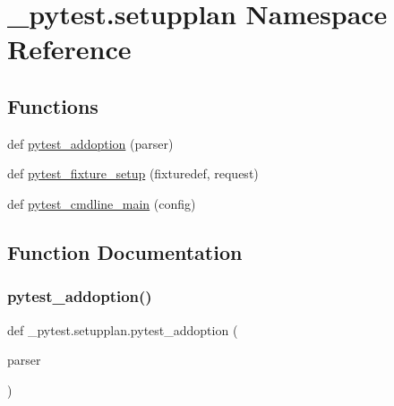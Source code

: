 \hypertarget{namespace__pytest_1_1setupplan}{}\section{\+\_\+pytest.\+setupplan Namespace Reference}
\label{namespace__pytest_1_1setupplan}
\subsection*{Functions}
\begin{DoxyCompactItemize}
\item 
def \hyperlink{namespace__pytest_1_1setupplan_ac461db32bf7c1e9e503e90c7536ec6a9}{pytest\+\_\+addoption} (parser)
\item 
def \hyperlink{namespace__pytest_1_1setupplan_aa46528d134f83e8a0d502004f4ea6d4a}{pytest\+\_\+fixture\+\_\+setup} (fixturedef, request)
\item 
def \hyperlink{namespace__pytest_1_1setupplan_adeec071639e1ebcfd89e8e5948d473c4}{pytest\+\_\+cmdline\+\_\+main} (config)
\end{DoxyCompactItemize}


\subsection{Function Documentation}
\mbox{\label{namespace__pytest_1_1setupplan_ac461db32bf7c1e9e503e90c7536ec6a9}} 
\subsubsection{\texorpdfstring{pytest\+\_\+addoption()}{pytest\_addoption()}}
{\footnotesize\ttfamily def \+\_\+pytest.\+setupplan.\+pytest\+\_\+addoption (\begin{DoxyParamCaption}\item[{}]{parser }\end{DoxyParamCaption})}

\mbox{\label{namespace__pytest_1_1setupplan_adeec071639e1ebcfd89e8e5948d473c4}} 
